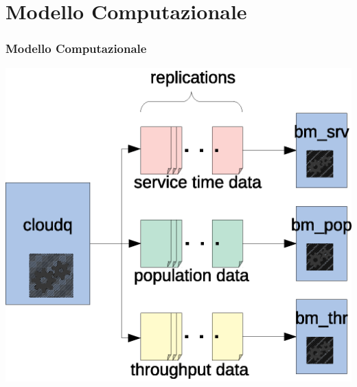 \section{Modello Computazionale}
\begin{frame}
\frametitle{Modello Computazionale}
\begin{center}
\includegraphics[width=.7\textwidth]{../figures/comp}
\end{center}
\end{frame}
